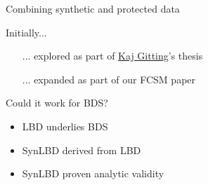 \begin{frame}{Combining synthetic and protected data}
\begin{block}{Initially...}
\begin{itemize}
\item[...] explored as part of \href{http://www.myweb.ttu.edu/rgitting/}{Kaj Gitting}'s thesis \cite{Gittings2009thesis}
\item[...] expanded as part of our FCSM paper \cite{AbowdEtAl2012}
\end{itemize}
\end{block}
\begin{block}{Could it work for BDS?}
\begin{itemize}
\item LBD underlies BDS
\item SynLBD derived from LBD
\item SynLBD proven analytic validity
\end{itemize}
\end{block}
\end{frame}


